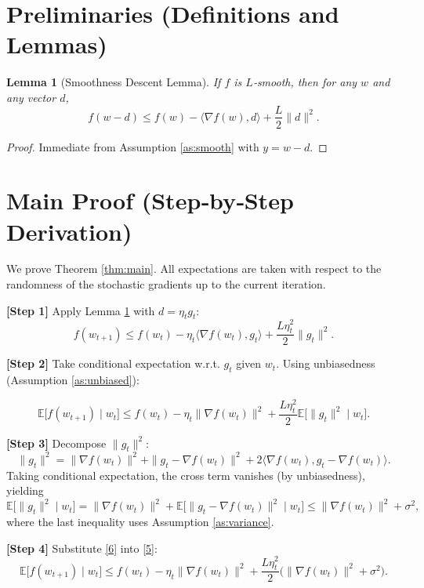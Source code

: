 \documentclass{article}
\newtheorem{lemma}{Lemma}
\newcommand{\E}{\mathbb{E}}
\begin{document}
\newpage

\section*{Preliminaries (Definitions and Lemmas)}
\begin{lemma}[Smoothness Descent Lemma]\label{lem:smooth}
If $f$ is $L$‑smooth, then for any $w$ and any vector $d$,
\[
f(w-d)\le f(w)-\langle \nabla f(w),d\rangle+\frac{L}{2}\|d\|^{2}.
\]
\end{lemma}
\begin{proof}
Immediate from Assumption \ref{as:smooth} with $y=w-d$.
\end{proof}

\section*{Main Proof (Step‑by‑Step Derivation)}
We prove Theorem \ref{thm:main}.  All expectations are taken with respect to the randomness
of the stochastic gradients up to the current iteration.

\bigskip
\noindent\textbf{[Step 1]} Apply Lemma \ref{lem:smooth} with $d=\eta_{t}g_{t}$:
\[
f(w_{t+1})\le f(w_{t})-\eta_{t}\langle\nabla f(w_{t}),g_{t}\rangle
               +\frac{L\eta_{t}^{2}}{2}\|g_{t}\|^{2}.
\tag{4}
\]

\noindent\textbf{[Step 2]} Take conditional expectation w.r.t. $g_{t}$ given $w_{t}$.
Using unbiasedness (Assumption \ref{as:unbiased}):

\[
\E\!\big[f(w_{t+1})\mid w_{t}\big]
\le f(w_{t})-\eta_{t}\|\nabla f(w_{t})\|^{2}
   +\frac{L\eta_{t}^{2}}{2}\E\!\big[\|g_{t}\|^{2}\mid w_{t}\big].
\tag{5}
\]

\noindent\textbf{[Step 3]} Decompose $\|g_{t}\|^{2}$:
\[
\|g_{t}\|^{2}= \|\nabla f(w_{t})\|^{2}
            +\|g_{t}-\nabla f(w_{t})\|^{2}
            +2\langle\nabla f(w_{t}),g_{t}-\nabla f(w_{t})\rangle .
\]
Taking conditional expectation, the cross term vanishes (by unbiasedness), yielding
\[
\E\!\big[\|g_{t}\|^{2}\mid w_{t}\big]
= \|\nabla f(w_{t})\|^{2}
  +\E\!\big[\|g_{t}-\nabla f(w_{t})\|^{2}\mid w_{t}\big]
\le \|\nabla f(w_{t})\|^{2}+\sigma^{2},
\tag{6}
\]
where the last inequality uses Assumption \ref{as:variance}.

\noindent\textbf{[Step 4]} Substitute \eqref{6} into \eqref{5}:
\[
\E\!\big[f(w_{t+1})\mid w_{t}\big]
\le f(w_{t})
   -\eta_{t}\|\nabla f(w_{t})\|^{2}
   +\frac{L\eta_{t}^{2}}{2}\big(\|\nabla f(w_{t})\|^{2}+\sigma^{2}\big).
\tag{7}
\]
\end{document}
